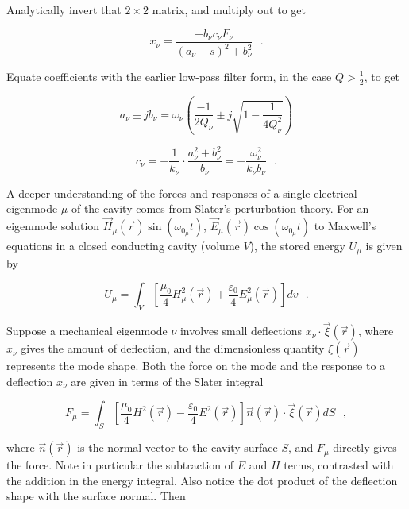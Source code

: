 \documentclass[a4paper,12pt]{article}
\begin{document}
\noindent Analytically invert that $2\times 2$ matrix, and multiply out to get

\begin{equation}
x_{\nu} = \frac{-b_{\nu}c_{\nu}F_{\nu}}{ (a_{\nu}-s)^2 + b_{\nu}^2}~~~.
\end{equation}

\noindent Equate coefficients with the earlier low-pass filter form, in the case $Q > \frac{1}{2}$, to get

\begin{equation}
a_{\nu}\pm jb_{\nu} = \omega_{\nu}\left( \frac{-1}{2Q_{\nu}} \pm j\sqrt{1-\frac{1}{4Q_{\nu}^2}}\right)
\end{equation}

\begin{equation}
c_{\nu} = -\frac{1}{k_{\nu}}\cdot\frac{a_{\nu}^2+b_{\nu}^2 }{ b_{\nu}} = - \frac{\omega_{\nu}^2}{k_{\nu} b_{\nu}}~~~.
\end{equation}

A deeper understanding of the forces and responses of a single electrical eigenmode $\mu$ of the cavity comes from Slater's perturbation theory.  For an eigenmode solution $\vec H_{\mu}(\vec r)\sin(\omega_{0_{\mu}} t)$, $\vec E_{\mu}(\vec r)\cos(\omega_{0_{\mu}} t)$ to Maxwell's equations in a closed conducting cavity (volume $V$), the stored energy $U_{\mu}$ is given by

\begin{equation} 
U_{\mu} = \int_V \left[ \frac{\mu_0}{4}H_{\mu}^2(\vec r)
                 +  \frac{\varepsilon_0}{4}E_{\mu}^2(\vec r) \right] dv~~~.
\end{equation}

Suppose a mechanical eigenmode $\nu$ involves small deflections $x_{\nu}\cdot \vec\xi(\vec r)$, where $x_{\nu}$ gives the amount of deflection, and the dimensionless quantity $\xi(\vec r)$ represents the mode shape. Both the force on the mode and the response to a deflection $x_{\nu}$ are given in terms of the Slater integral

\begin{equation}
 F_{\mu} = \int_S \left[ \frac{\mu_0    }{ 4}H^2(\vec r)
                 -  \frac{\varepsilon_0}{ 4}E^2(\vec r) \right]
   \vec n(\vec r) \cdot \vec\xi(\vec r) dS ~~~,
\end{equation}

\noindent where $\vec n(\vec r)$ is the normal vector to the cavity surface $S$, and $F_{\mu}$ directly gives the force. Note in particular the subtraction of $E$ and $H$ terms, contrasted with the addition in the energy integral.  Also notice the dot product of the deflection shape with the surface normal.  Then
\end{document}
